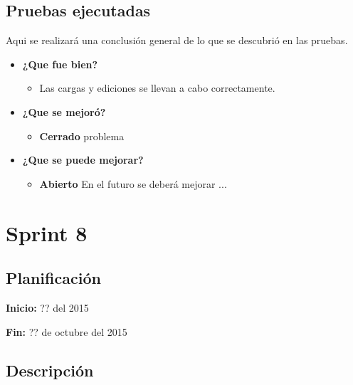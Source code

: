 \documentclass[a4paper,12pt]{article}
\begin{document}
\subsection{Pruebas ejecutadas}
Aqui se realizará una conclusión general de lo que se descubrió en las pruebas.
	\begin{itemize}
		\item \textbf{¿Que fue bien?}
        	\begin{itemize}
				\item        Las cargas y ediciones se llevan a cabo correctamente.
			\end{itemize}

   		\item \textbf{¿Que se mejoró?}
        	\begin{itemize}
                \item \textbf{Cerrado} problema
			\end{itemize}

   		\item \textbf{¿Que se puede mejorar?}
        	\begin{itemize}
		        \item \textbf{Abierto} En el futuro se deberá mejorar ...
            \end{itemize}
        

	\end{itemize}

\section{Sprint 8} %

\subsection{Planificación}

\textbf{Inicio: }?? del 2015 

\textbf{Fin:} ?? de octubre del 2015



\subsection{Descripción}
\end{document}
